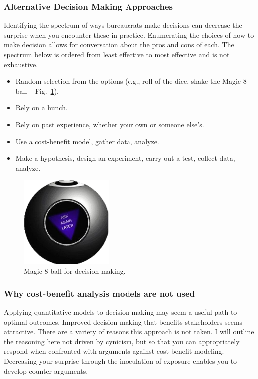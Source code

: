 \subsubsection{Alternative Decision Making Approaches}
Identifying the spectrum of ways bureaucrats make decisions can decrease the surprise when you encounter these in practice. Enumerating the choices of how to make decision allows for conversation about the pros and cons of each. The spectrum below is ordered from least effective to most effective and is not exhaustive.
\begin{itemize}
    \item Random selection from the options (e.g., roll of the dice, shake the Magic 8 ball -- Fig.~\ref{fig:magic8ball}).
    \item Rely on a hunch.
    \item Rely on past experience, whether your own or someone else's.
    \item Use a cost-benefit model, gather data, analyze.
    \item Make a hypothesis, design an experiment, carry out a test, collect data, analyze.
\end{itemize}

\begin{figure}
    \centering
    \includegraphics[width=0.4\textwidth]{images/magic8ball.pdf}
    \caption{Magic 8 ball for decision making.}
    \label{fig:magic8ball}
\end{figure}

\subsubsection{Why cost-benefit analysis models are not used}

Applying quantitative models to decision making may seem a useful path to optimal outcomes. Improved decision making that benefits stakeholders seems attractive. There are a variety of reasons this approach is not taken. I will outline the reasoning here not driven by cynicism, but so that you can appropriately respond when confronted with arguments against cost-benefit modeling. Decreasing your surprise through the inoculation of exposure enables you to develop counter-arguments. 


